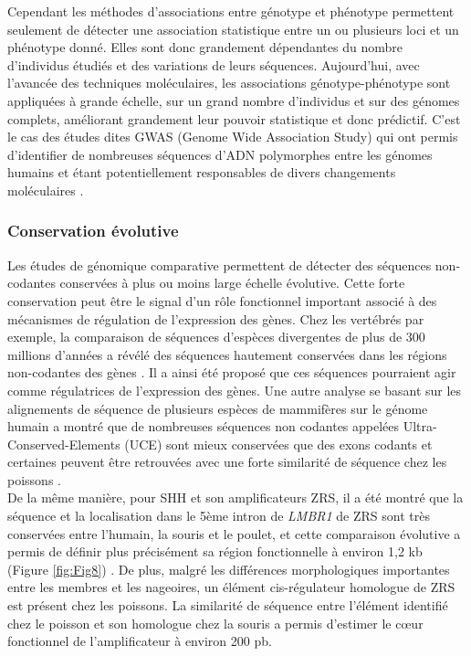Cependant les méthodes d'associations entre génotype et phénotype permettent seulement de détecter une association statistique entre un ou plusieurs loci et un phénotype donné. Elles sont donc grandement dépendantes du nombre d'individus étudiés et des variations de leurs séquences. Aujourd’hui, avec l’avancée des techniques moléculaires, les associations génotype-phénotype sont appliquées à grande échelle, sur un grand nombre d'individus et sur des génomes complets, améliorant grandement leur pouvoir statistique et donc prédictif. C’est le cas des études dites GWAS (Genome Wide Association Study) qui ont permis d’identifier de nombreuses séquences d’ADN polymorphes entre les génomes humains et étant potentiellement responsables de divers changements moléculaires \citep{lappalainen_evolutionary_2010, bryois_cis_2014}.

\subsubsection{Conservation évolutive}
\label{subsubsec:conserv-evol}

Les études de génomique comparative permettent de détecter des séquences non-codantes conservées à plus ou moins large échelle évolutive. Cette forte conservation peut être le signal d’un rôle fonctionnel important associé à des mécanismes de régulation de l’expression des gènes. Chez les vertébrés par exemple, la comparaison de séquences d’espèces divergentes de plus de 300 millions d’années a révélé des séquences hautement conservées dans les régions non-codantes des gènes \citep{duret_strong_1993}. Il a ainsi été proposé que ces séquences pourraient agir comme régulatrices de l’expression des gènes. Une autre analyse se basant sur les alignements de séquence de plusieurs espèces de mammifères sur le génome humain a montré que de nombreuses séquences non codantes appelées Ultra-Conserved-Elements (UCE) sont mieux conservées que des exons codants et certaines peuvent être retrouvées avec une forte similarité de séquence chez les poissons \citep{bejerano_ultraconserved_2004}. \\

De la même manière, pour \acrshort{SHH} et son \glspl{amplificateur} \acrshort{ZRS}, il a été montré que la séquence et la localisation dans le 5ème intron de \textit{LMBR1} de \acrshort{ZRS} sont très conservées entre l’humain, la souris et le poulet, et cette comparaison évolutive a permis de définir plus précisément sa région fonctionnelle à environ 1,2 kb (Figure \ref{fig:Fig8}) \citep{lettice_long-range_2003, sagai_elimination_2005}. De plus, malgré les différences morphologiques importantes entre les membres et les nageoires, un élément \gls{cis}-régulateur homologue de \acrshort{ZRS} est présent chez les poissons. La similarité de séquence entre l’élément  identifié chez le poisson et son homologue chez la souris a permis d’estimer le cœur fonctionnel de l’\gls{amplificateur} à environ 200 pb.

